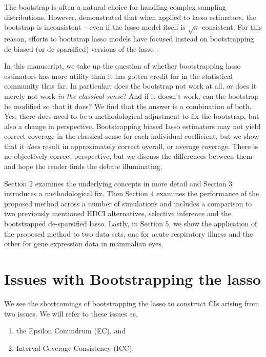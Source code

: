The bootstrap is often a natural choice for handling complex sampling distributions. However, \cite{Chatterjee2010} demonstrated that when applied to lasso estimators, the bootstrap is inconsistent -- even if the lasso model itself is $\sqrt{n}$-consistent. For this reason, efforts to bootstrap lasso models have focused instead on bootstrapping de-biased (or de-sparsified) versions of the lasso \citep{Dezeure2017}.

In this manuscript, we take up the question of whether bootstrapping lasso estimators has more utility than it has gotten credit for in the statistical community thus far. In particular: does the bootstrap not work at all, or does it merely not work \emph{in the classical sense}? And if it doesn't work, can the bootstrap be modified so that it does? We find that the answer is a combination of both. Yes, there does need to be a methodological adjustment to fix the bootstrap, but also a change in perspective. Bootstrapping biased lasso estimators may not yield correct coverage in the classical sense for each individual coefficient, but we show that it \emph{does} result in approximately correct overall, or average coverage. There is no objectively correct perspective, but we discuss the differences between them and hope the reader finds the debate illuminating.

Section 2 examines the underlying concepts in more detail and Section 3 introduces a methodological fix. Then Section 4 examines the performance of the proposed method across a number of simulations and includes a comparison to two previously mentioned HDCI alternatives, selective inference and the bootstrapped de-sparsified lasso. Lastly, in Section 5, we show the application of the proposed method to two data sets, one for acute respiratory illness and the other for gene expression data in mammalian eyes.

\section{Issues with Bootstrapping the lasso}
\label{Sec:Difficulties}

We see the shortcomings of bootstrapping the lasso to construct CIs arising from two issues. We will refer to these issues as,

\begin{enumerate}
\item the Epsilon Conundrum (EC), and
\item Interval Coverage Consistency (ICC).
\end{enumerate}

